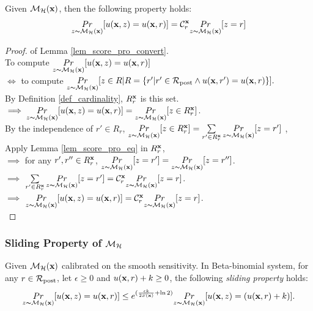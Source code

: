 \documentclass{article}
\begin{document}
\begin{lem}
\label{lem_score_pro_convert}
 Given $\hexpmech(\dataobs)$, then the following property holds:
\begin{equation*}
\hexpmechPr{\dataobs}{\ux{z} = \ux{r}} = \cardinality{\dataobs}{r}\hexpmechPr{\dataobs}{z = r}
 \end{equation*}
\end{lem}
\begin{proof} of Lemma \ref{lem_score_pro_convert}.\\
To compute $\hexpmechPr{\dataobs}{\ux{z} = \ux{r}}$\\
$\iff $ to compute $\hexpmechPr{\dataobs}{ z \in R | R = \{r' | r' \in \candidateset \land \ux{r'} = \ux{r}\}}.$\\
By Definition \ref{def_cardinality}, $R^{\dataobs}_r$ is this set.\\
$\implies \hexpmechPr{\dataobs}{\ux{z} = \ux{r}} = \hexpmechPr{\dataobs}{z \in R^{\dataobs}_r} $.\\
By the independence of $r' \in R_r$, $ \hexpmechPr{\dataobs}{z \in R^{\dataobs}_r}  =\sum\limits_{r'\in R^{\dataobs}_r} \hexpmechPr{\dataobs}{z = r'}$ ,\\
Apply Lemma \ref{lem_score_pro_eq} in $R^{\dataobs}_r$, \\
$\implies$ for any $r', r''\in R^{\dataobs}_r$, $\hexpmechPr{\dataobs}{z = r'} = \hexpmechPr{\dataobs}{z = r''}$.\\
$\implies$ $\sum\limits_{r'\in R^{\dataobs}_r} \hexpmechPr{\dataobs}{z = r'} = \cardinality{\dataobs}{r}\hexpmechPr{\dataobs}{z = r}$.\\
$\implies$ $\hexpmechPr{\dataobs}{\ux{z} = \ux{r}} = \cardinality{\dataobs}{r}\hexpmechPr{\dataobs}{z = r}$.\\
\end{proof}


\subsubsection{Sliding Property of $\hexpmech$}


\begin{lem}
\label{lem_sliding}

Given $\hexpmech(\dataobs)$ calibrated on the smooth sensitivity. In Beta-binomial system, for any $r\in \candidateset$, let $\epsilon\geq 0$ and $\ux{r} + k \geq 0$, the following \emph{sliding property} holds:
\begin{equation*}
\hexpmechPr{\dataobs}{\ux{z} = \ux{r}}
\leq
e^{(\frac{\epsilon k}{2 S(\dataobs)} + \ln 2)} \hexpmechPr{\dataobs}{\ux{z} = ( \ux{r} + k)}.
\end{equation*}
\end{lem}
\end{document}
